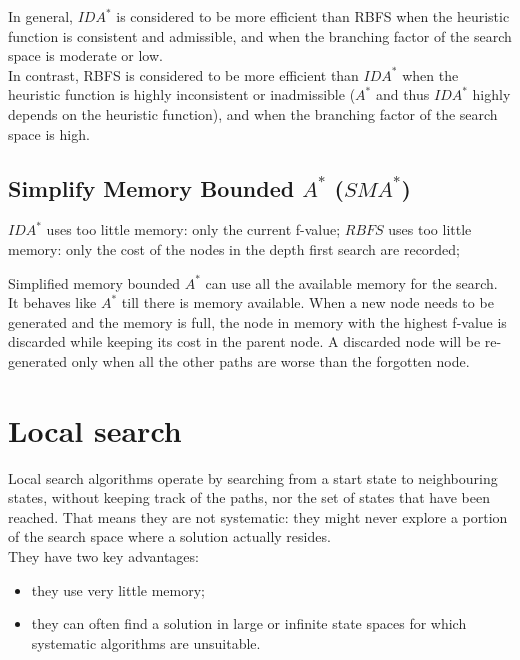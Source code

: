 \documentclass{article}
\begin{document}
In general, $IDA^*$ is considered to be more efficient than RBFS when the heuristic function is consistent and admissible, and when the branching factor of the search space is moderate or low. \\

In contrast, RBFS is considered to be more efficient than $IDA^*$ when the heuristic function is highly inconsistent or inadmissible ($A^*$ and thus $IDA^*$ highly depends on the heuristic function), and when the branching factor of the search space is high.

\subsection{Simplify Memory Bounded $A^*$ ($SMA^*$)}

\begin{center}
    $IDA^*$ uses too little memory: only the current f-value;
    $RBFS$ uses too little memory: only the cost of the nodes in the depth first search are recorded;
\end{center}

Simplified memory bounded $A^*$ can use all the available memory for the search. It behaves like $A^*$ till there is memory available. When a new node needs to be generated and the memory is full, the node in memory with the highest f-value is discarded while keeping its cost in the parent node. A discarded node will be re-generated only when all the other paths are worse than the forgotten node.

\newpage

\section{Local search}

Local search algorithms operate by searching from a start state to neighbouring states, without keeping track of the paths, nor the set of states that have been reached. That means they are not systematic: they might never explore a portion of the search space where a solution actually resides. \\

They have two key advantages:

\begin{itemize}
    \item they use very little memory;
    \item they can often find a solution in large or infinite state spaces for which systematic algorithms are unsuitable.
\end{itemize}
\end{document}
